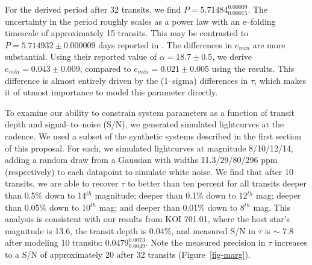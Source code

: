 For the derived period after 32 transits, we find $P =
5.71484_{0.00015}^{0.00009}$.  The uncertainty in the period roughly
scales as a power law with an e--folding timescale of approximately 15
transits.  This may be contrasted to $P = 5.714932 \pm 0.000009$ days
reported in \cite{2013arXiv1304.7387B}.  The differences in $e_{min}$
are more substantial.  Using their reported value of $\alpha =
18.7 \pm 0.5$, we derive $e_{min} = 0.043 \pm 0.009$, compared to
$e_{min} = 0.021 \pm 0.005$ using the \cite{2013arXiv1304.7387B}
results.  This difference is almost entirely driven by the (1--sigma)
differences in $\tau$, which makes it of utmost importance to model
this parameter directly.

To examine our ability to constrain system parameters as a function of
transit depth and signal--to--noise (S/N), we generated simulated
lightcurves at the \kepler cadence.  We used a subset of the synthetic
systems described in the first section of this proposal.  For each, we
simulated lightcurves at magnitude 8/10/12/14, adding a random draw
from a Gaussian with widths 11.3/29/80/296 ppm (respectively) to each
datapoint to simulate white noise.  We find that after 10 transits, we
are able to recover $\tau$ to better than ten percent for all transits
deeper than 0.5\% down to 14$^{th}$ magnitude; deeper than 0.1\% down
to 12$^{th}$ mag; deeper than 0.05\% down to 10$^{th}$ mag; and deeper
than 0.01\% down to 8$^{th}$ mag.  This analysis is consistent with
our results from KOI 701.01, where the host star's magnitude is 13.6,
the transit depth is 0.04\%, and measured S/N in $\tau$ is $\sim$ 7.8
after modeling 10 transits: $0.0479_{0.0049}^{0.0073}$.  Note the
measured precision in $\tau$ increases to a S/N of approximately 20
after 32 transits (Figure~\ref{fig-marg}).


